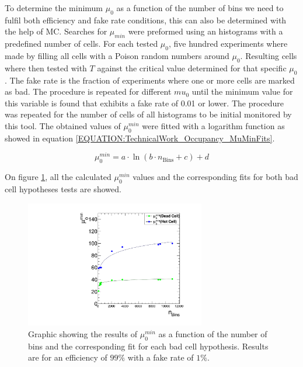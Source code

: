 To determine the minimum $\mu_0$ as a function of the number of bins we need to fulfil both efficiency and fake rate conditions, this can also be determined with the help of \gls{MC}. Searches for $\mu_{min}$ were preformed using an histograms with a predefined number of cells. For each tested $\mu_{0}$, five hundred experiments where made by filling all cells with a Poison random numbers around $\mu_0$. Resulting cells where then tested with $T$ against the critical value determined for that specific $\mu_0$. The fake rate is the fraction of experiments where one or more cells are marked as bad. The procedure is repeated for different $mu_{0}$ until the minimum value for this variable is found that exhibits a fake rate of 0.01 or lower. The procedure was repeated for the number of cells of all histograms to be initial monitored by this tool. The obtained values of $\mu_0^{min}$ were fitted with a logarithm function as showed in equation \ref{EQUATION:TechnicalWork_Occupancy_MuMinFits}.

\begin{equation}
\mu_{0}^{min}= a \cdot \ln(b \cdot n_{\text{Bins}} + c) + d
\label{EQUATION:TechnicalWork_Occupancy_MuMinFits}
\end{equation}

On figure \ref{FIGURE:TechnicalWork_L1TOccupancyMuMin}, all the calculated $\mu_0^{min}$ values and the corresponding fits for both bad cell hypotheses tests are showed.

\begin{figure}[!htb]
\centering
\includegraphics[width=0.70\textwidth]{Chapter03/L1TOnline/Images/L1TOccupancy_MuMin.pdf}
\caption{Graphic showing the results of $\mu_0^{min}$ as a function of the number of bins and the corresponding fit for each bad cell hypothesis. Results are for an efficiency of $99\%$ with a fake rate of $1\%$.}
\label{FIGURE:TechnicalWork_L1TOccupancyMuMin}
\end{figure}

